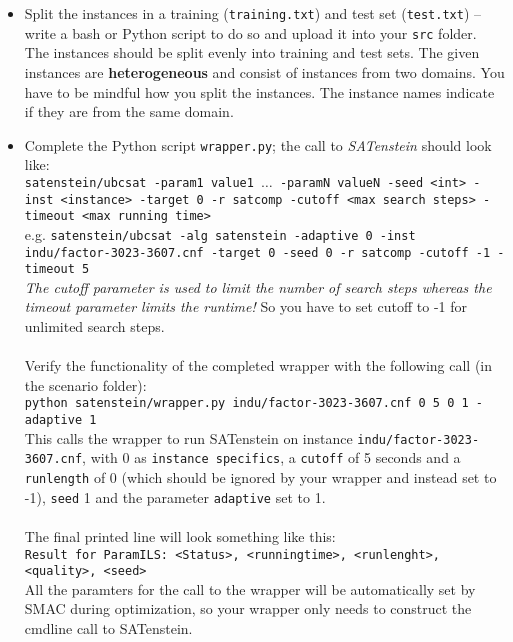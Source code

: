 \documentclass{exam}
\begin{document}
\begin{questions}
		\begin{itemize}
			\item Split the instances in a training (\texttt{training.txt}) and test set (\texttt{test.txt}) -- write a bash or Python script to do so and upload it into your \texttt{src} folder. The instances should be split evenly into training and test sets. The given instances are \textbf{heterogeneous} and consist of instances from two domains. You have to be mindful how you split the instances. The instance names indicate if they are from the same domain.
			\item Complete the Python script \texttt{wrapper.py}; the call to \textit{SATenstein} should look like:\\
			\texttt{\small satenstein/ubcsat -param1 value1 $\ldots$ -paramN valueN -seed <int> -inst <instance> -target 0 -r satcomp -cutoff <max search steps> -timeout <max running time>}\\
			e.g. \texttt{\small satenstein/ubcsat -alg satenstein -adaptive 0 -inst indu/factor-3023-3607.cnf -target 0 -seed 0 -r satcomp -cutoff -1 -timeout 5}\\
			\textit{The cutoff parameter is used to limit the number of search steps whereas the timeout parameter limits the runtime!} So you have to set cutoff to -1 for unlimited search steps.\\
			\\
			Verify the functionality of the completed wrapper with the following call (in the scenario folder):\\
			\texttt{\small python satenstein/wrapper.py indu/factor-3023-3607.cnf 0 5 0 1 -adaptive 1}\\
			This calls the wrapper to run SATenstein on instance \texttt{indu/factor-3023-3607.cnf}, with 0 as \texttt{instance specifics}, a  \texttt{cutoff} of 5 seconds and a  \texttt{runlength} of 0 (which should be ignored by your wrapper and instead set to -1),  \texttt{seed} 1 and the parameter \texttt{adaptive} set to 1.\\
			\\ The final printed line will look something like this:\\
			\texttt{\small Result for ParamILS: <Status>, <runningtime>, <runlenght>, <quality>, <seed>}
			\\
			All the paramters for the call to the wrapper will be automatically set by SMAC during optimization, so your wrapper only needs to construct the cmdline call to SATenstein.
			

\end{itemize}
\end{questions}
\end{document}
